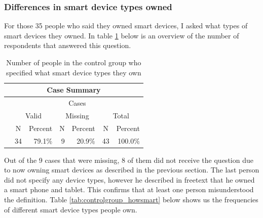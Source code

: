 \subsubsection{Differences in smart device types owned}
For those 35 people who said they owned smart devices, I asked what types of smart devices they owned. In table \ref{tab:controlgroup_howsmart_N} below is an overview of the number of respondents that answered this question. 
\begin{table}[!h]
\centering
\begin{tabular}{|l|c|c|c|c|c|c|}
\hline
\multicolumn{7}{|c|}{{\color[HTML]{010205} \textbf{Case Summary}}} \\ \hline
{\color[HTML]{264A60} } &
  \multicolumn{6}{c|}{{\color[HTML]{264A60} Cases}} \\ \cline{2-7} 
{\color[HTML]{264A60} } &
  \multicolumn{2}{c|}{{\color[HTML]{264A60} Valid}} &
  \multicolumn{2}{c|}{{\color[HTML]{264A60} Missing}} &
  \multicolumn{2}{c|}{{\color[HTML]{264A60} Total}} \\ \cline{2-7} 
\multirow{-3}{*}{{\color[HTML]{264A60} }} &
  {\color[HTML]{264A60} N} &
  {\color[HTML]{264A60} Percent} &
  {\color[HTML]{264A60} N} &
  {\color[HTML]{264A60} Percent} &
  {\color[HTML]{264A60} N} &
  {\color[HTML]{264A60} Percent} \\ \hline
\cellcolor[HTML]{E0E0E0}{\color[HTML]{264A60} Smart devices} &
  \multicolumn{1}{r|}{{\color[HTML]{010205} 34}} &
  \multicolumn{1}{r|}{{\color[HTML]{010205} 79.1\%}} &
  \multicolumn{1}{r|}{{\color[HTML]{010205} 9}} &
  \multicolumn{1}{r|}{{\color[HTML]{010205} 20.9\%}} &
  \multicolumn{1}{r|}{{\color[HTML]{010205} 43}} &
  \multicolumn{1}{r|}{{\color[HTML]{010205} 100.0\%}} \\ \hline
\end{tabular}
\caption{Number of people in the control group who specified what smart device types they own}
\label{tab:controlgroup_howsmart_N}
\end{table}
Out of the 9 cases that were missing, 8 of them did not receive the question due to now owning smart devices as described in the previous section. The last person did not specify any device types, however he described in freetext that he owned a smart phone and tablet. This confirms that at least one person misunderstood the definition. 
Table \ref{tab:controlgroup_howsmart} below shows us the frequencies of different smart device types people own. 
